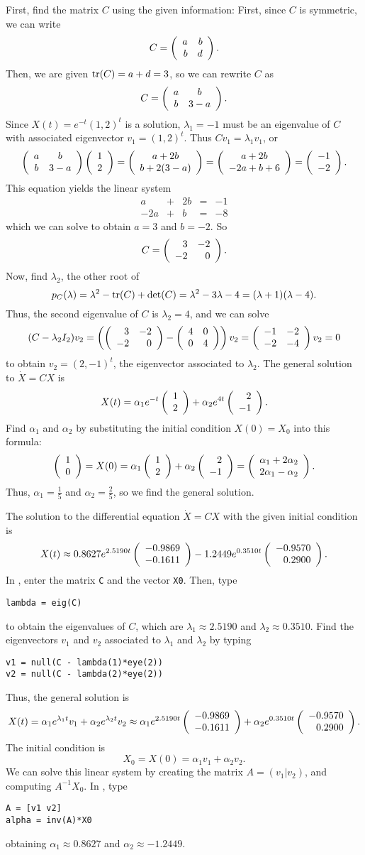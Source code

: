 \soln First, find the matrix $C$ using the given information:
First, since $C$ is symmetric, we can write
\[
C = \left(\begin{array}{rr} a & b\\ b &d\end{array}\right).
\]
Then, we are given ${\rm tr}(C) = a + d = 3$, so we can rewrite $C$ as
\[
C = \left(\begin{array}{cc} a & b\\ b &3 - a\end{array}\right).
\]
Since $X(t) = e^{-t}(1,2)^t$ is a solution, $\lambda_1 = -1$
must be an eigenvalue of $C$ with associated eigenvector $v_1 = (1,2)^t$.
Thus $Cv_1 = \lambda_1v_1$, or
\[
\left(\begin{array}{cc} a & b\\ b &3 - a\end{array}\right)\left(\begin{array}{r} 1 \\ 2\end{array}\right) = \left(\begin{array}{c} a + 2b \\ b + 2(3 - a)\end{array}\right)
= \left(\begin{array}{c} a + 2b \\ -2a + b + 6\end{array}\right) = \left(\begin{array}{r} -1 \\ -2\end{array}\right).
\]
This equation yields the linear system
\[
\begin{array}{rrrrr}
a & + & 2b & = & -1 \\
-2a & + & b & = & -8
\end{array}
\]
which we can solve to obtain $a = 3$ and $b = -2$.  So
\[
C = \left(\begin{array}{rr} 3 & -2\\ -2 &0\end{array}\right).
\]
Now, find $\lambda_2$, the other root of
\[
p_C(\lambda) = \lambda^2 - {\rm tr}(C) + \det(C) = \lambda^2 - 3\lambda -4
= (\lambda + 1)(\lambda - 4).
\]
Thus, the second eigenvalue of $C$ is $\lambda_2 = 4$, and we can solve
\[
(C - \lambda_2I_2)v_2 = \left(\left(\begin{array}{rr} 3 & -2\\ -2 &0\end{array}\right) - \left(\begin{array}{rr} 4 & 0\\ 0 &4\end{array}\right)
\right)v_2 = \left(\begin{array}{rr} -1 & -2\\ -2 &-4\end{array}\right)v_2 = 0
\]
to obtain $v_2 = (2,-1)^t$, the eigenvector associated to $\lambda_2$.
The general solution to $\dot{X} = CX$ is
\[
X(t) = \alpha_1e^{-t}\left(\begin{array}{r} 1 \\ 2\end{array}\right) + \alpha_2e^{4t}\left(\begin{array}{r} 2 \\ -1\end{array}\right).
\]
Find $\alpha_1$ and $\alpha_2$ by substituting the initial condition $X(0)
= X_0$ into this formula:
\[
\left(\begin{array}{r} 1 \\ 0\end{array}\right) = X(0) = \alpha_1\left(\begin{array}{r} 1 \\ 2\end{array}\right) + \alpha_2\left(\begin{array}{r} 2 \\ -1\end{array}\right)
= \left(\begin{array}{c} \alpha_1 + 2\alpha_2 \\ 2\alpha_1 - \alpha_2\end{array}\right).
\]
Thus, $\alpha_1 = \frac{1}{5}$ and $\alpha_2 = \frac{2}{5}$, so we find
the general solution.


 \ans The solution to the differential equation $\dot{X}
= CX$ with the given initial condition is
\[
X(t) \approx 0.8627e^{2.5190t}\left(\begin{array}{r} -0.9869 \\ -0.1611\end{array}\right)
- 1.2449e^{0.3510t}\left(\begin{array}{r} -0.9570 \\ 0.2900\end{array}\right).
\]
\soln In \Matlabp, enter the matrix {\tt C} and the vector {\tt X0}.  Then,
type
\begin{verbatim}
lambda = eig(C)
\end{verbatim}
to obtain the eigenvalues of $C$, which are
$\lambda_1 \approx 2.5190$ and $\lambda_2 \approx 0.3510$.  Find the
eigenvectors $v_1$ and $v_2$ associated to $\lambda_1$ and $\lambda_2$
by typing
\begin{verbatim}
v1 = null(C - lambda(1)*eye(2))
v2 = null(C - lambda(2)*eye(2))
\end{verbatim}
Thus, the general solution is
\[
X(t) = \alpha_1e^{\lambda_1 t}v_1 + \alpha_2e^{\lambda_2 t}v_2
\approx \alpha_1e^{2.5190t}\left(\begin{array}{r} -0.9869 \\ -0.1611\end{array}\right) +
\alpha_2e^{0.3510t}\left(\begin{array}{r} -0.9570 \\ 0.2900\end{array}\right).
\]
The initial condition is
\[
X_0 = X(0) = \alpha_1v_1 + \alpha_2v_2.
\]
We can solve this linear system by creating the matrix $A = (v_1|v_2)$, and
computing $A^{-1}X_0$.  In \Matlabp, type
\begin{verbatim}
A = [v1 v2]
alpha = inv(A)*X0
\end{verbatim}
obtaining $\alpha_1 \approx 0.8627$ and $\alpha_2 \approx -1.2449$.



